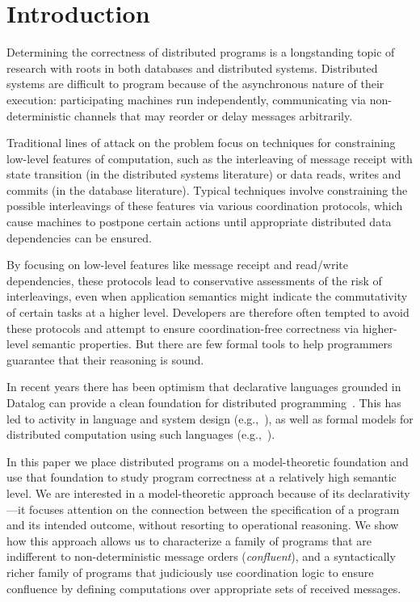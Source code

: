 \section{Introduction}
Determining the correctness of distributed programs is a longstanding topic of research with roots in both databases and distributed systems.  Distributed systems are difficult to program because of the asynchronous nature of their execution: participating machines run independently, communicating via non-deterministic channels that may reorder or delay messages arbitrarily.  

Traditional lines of attack on the problem focus on techniques for constraining low-level features of computation, such as the interleaving of message receipt with state transition (in the distributed systems literature) or data reads, writes and commits (in the database literature).  Typical techniques involve constraining the possible interleavings of these features via various coordination protocols, which cause machines to postpone certain actions until appropriate distributed data dependencies can be ensured.

By focusing on low-level features like message receipt and read/write dependencies, these protocols lead to conservative assessments of the risk of interleavings, even when application semantics might indicate the commutativity of certain tasks at a higher level. Developers are therefore often tempted to avoid these protocols and attempt to ensure coordination-free correctness via higher-level semantic properties.  But there are few formal tools to help programmers guarantee that their reasoning is sound.

In recent years there has been optimism that declarative languages grounded in
Datalog can provide a clean foundation for distributed
programming~\cite{declarative-imperative}.  This has led to activity in language
and system design (e.g.,~\cite{boom,Belaramani:2009,Chu:2007,Loo2009-CACM}), as well as formal
models for distributed computation using such
languages (e.g.,~\cite{relational-transducers,navarro-oper-sem,card-abstraction}).

In this paper we place distributed programs on a model-theoretic foundation and use that foundation to study program correctness at a relatively high semantic level.  We are interested in a model-theoretic approach because of its declarativity---it focuses attention on the connection between the specification of a program and its intended outcome, without resorting to operational reasoning.  We show how this approach allows us to characterize a family of programs that are indifferent to non-deterministic message orders (\emph{confluent}), and a syntactically richer family of programs that judiciously use coordination logic to ensure confluence by defining computations over appropriate sets of received messages.

